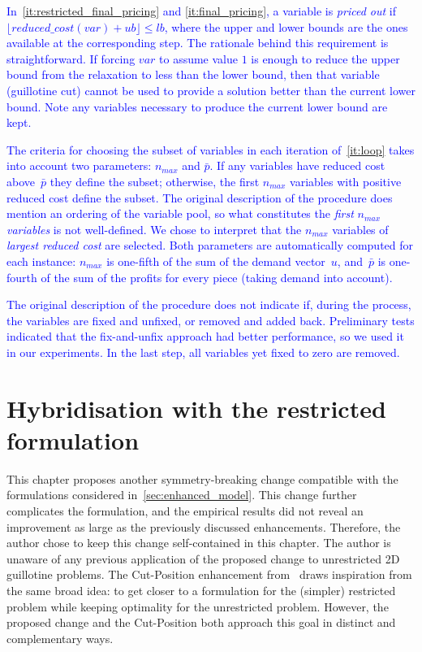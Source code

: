 \documentclass[ppgc,tese,english,formais,babel]{iiufrgs}
\newif\iffinalversion
\newcommand{\newtext}[1]{\iffinalversion%
#1%
\else%
\textcolor{blue}{#1}%
\fi%
}
\begin{document}
\newtext{
In~\autoref{it:restricted_final_pricing} and \autoref{it:final_pricing}, a variable is \emph{priced out} if \(\lfloor reduced\_cost(var) + ub \rfloor \leq lb\), where the upper and lower bounds are the ones available at the corresponding step. The rationale behind this requirement is straightforward. If forcing \(var\) to assume value \(1\) is enough to reduce the upper bound from the relaxation to less than the lower bound, then that variable (guillotine cut) cannot be used to provide a solution better than the current lower bound. Note any variables necessary to produce the current lower bound are kept.
}

\newtext{
The criteria for choosing the subset of variables in each iteration of~\autoref{it:loop} takes into account two parameters: \(n_{max}\) and \(\bar{p}\). If any variables have reduced cost above~\(\bar{p}\) they define the subset; otherwise, the first \(n_{max}\) variables with positive reduced cost define the subset. The original description of the procedure does mention an ordering of the variable pool, so what constitutes the \emph{first} \(n_{max}\) \emph{variables} is not well-defined. We chose to interpret that the \(n_{max}\) variables of \emph{largest reduced cost} are selected. Both parameters are automatically computed for each instance: \(n_{max}\) is one-fifth of the sum of the demand vector~\(u\), and~\(\bar{p}\) is one-fourth of the sum of the profits for every piece (taking demand into account).
}

\newtext{
The original description of the procedure does not indicate if, during the process, the variables are fixed and unfixed, or removed and added back.
Preliminary tests indicated that the fix-and-unfix approach had better performance, so we used it in our experiments.
In the last step, all variables yet fixed to zero are removed.
}

\chapter{Hybridisation with the restricted formulation}

This chapter proposes another symmetry-breaking change compatible with the formulations considered in~\cref{sec:enhanced_model}.
This change further complicates the formulation, and the empirical results did not reveal an improvement as large as the previously discussed enhancements.
Therefore, the author chose to keep this change self-contained in this chapter.
The author is unaware of any previous application of the proposed change to unrestricted 2D guillotine problems.
The Cut-Position enhancement from~\citet{furini:2016} draws inspiration from the same broad idea: to get closer to a formulation for the (simpler) restricted problem while keeping optimality for the unrestricted problem.
However, the proposed change and the Cut-Position both approach this goal in distinct and complementary ways.
\end{document}
